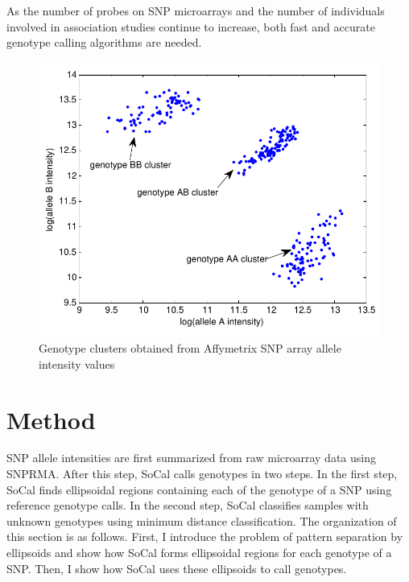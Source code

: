\documentclass{scrartcl}
\begin{document}
\par
As the number of probes on SNP microarrays and the number of individuals involved
in association studies continue to increase, both fast and accurate genotype
calling algorithms are needed.

\begin{figure}[H]
\centering
\includegraphics[scale=0.75]{intro_figs/intro_genotype_clusters.pdf}
\caption{Genotype clusters obtained from Affymetrix SNP array
allele intensity values}
\label{fig:intro_genclus}
\end{figure}










\section{Method}

\par
SNP allele intensities are first summarized from raw microarray data using
SNPRMA.
After this step, SoCal calls genotypes in two steps.
In the first step, SoCal finds ellipsoidal regions containing each of the
genotype of a SNP using reference genotype calls.
In the second step, SoCal classifies samples with unknown genotypes using
minimum distance classification.
The organization of this section is as follows.
First, I introduce the problem of pattern separation by ellipsoids and show
how SoCal forms ellipsoidal regions for each genotype of a SNP.
Then, I show how SoCal uses these ellipsoids to call genotypes.
\end{document}

